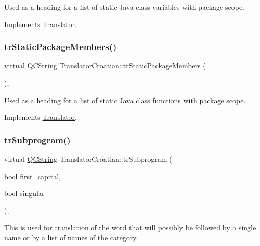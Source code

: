 Used as a heading for a list of static Java class variables with package scope. 

Implements \mbox{\hyperlink{class_translator}{Translator}}.

\mbox{\label{class_translator_croatian_ad5c1224f1961409410fa73c552e15e51}} 
\subsubsection{\texorpdfstring{trStaticPackageMembers()}{trStaticPackageMembers()}}
{\footnotesize\ttfamily virtual \mbox{\hyperlink{class_q_c_string}{Q\+C\+String}} Translator\+Croatian\+::tr\+Static\+Package\+Members (\begin{DoxyParamCaption}{ }\end{DoxyParamCaption})\hspace{0.3cm}{\ttfamily [inline]}, {\ttfamily [virtual]}}

Used as a heading for a list of static Java class functions with package scope. 

Implements \mbox{\hyperlink{class_translator}{Translator}}.

\mbox{\label{class_translator_croatian_ab5ccf8dd56048e10158a0ad5c528087c}} 
\subsubsection{\texorpdfstring{trSubprogram()}{trSubprogram()}}
{\footnotesize\ttfamily virtual \mbox{\hyperlink{class_q_c_string}{Q\+C\+String}} Translator\+Croatian\+::tr\+Subprogram (\begin{DoxyParamCaption}\item[{bool}]{first\+\_\+capital,  }\item[{bool}]{singular }\end{DoxyParamCaption})\hspace{0.3cm}{\ttfamily [inline]}, {\ttfamily [virtual]}}

This is used for translation of the word that will possibly be followed by a single name or by a list of names of the category. 

